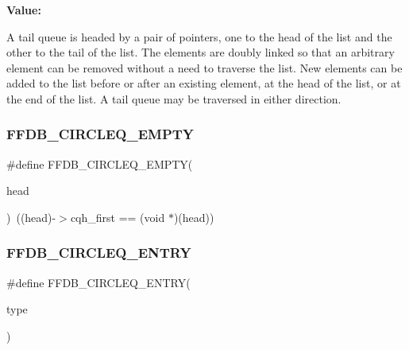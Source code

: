 {\bfseries Value\+:}
\begin{DoxyCode}{0}
\DoxyCodeLine{\}}

\end{DoxyCode}
A tail queue is headed by a pair of pointers, one to the head of the list and the other to the tail of the list. The elements are doubly linked so that an arbitrary element can be removed without a need to traverse the list. New elements can be added to the list before or after an existing element, at the head of the list, or at the end of the list. A tail queue may be traversed in either direction. \mbox{\label{adat-devel_2other__libs_2filedb_2filehash_2ffdb__cq_8h_a65ad566b610663661270032cbc4de6d2}} 
\subsubsection{\texorpdfstring{FFDB\_CIRCLEQ\_EMPTY}{FFDB\_CIRCLEQ\_EMPTY}}
{\footnotesize\ttfamily \#define F\+F\+D\+B\+\_\+\+C\+I\+R\+C\+L\+E\+Q\+\_\+\+E\+M\+P\+TY(\begin{DoxyParamCaption}\item[{}]{head }\end{DoxyParamCaption})~((head)-\/$>$cqh\+\_\+first == (void $\ast$)(head))}

\mbox{\label{adat-devel_2other__libs_2filedb_2filehash_2ffdb__cq_8h_a6c7c808085453506c051641493f1ee8e}} 
\subsubsection{\texorpdfstring{FFDB\_CIRCLEQ\_ENTRY}{FFDB\_CIRCLEQ\_ENTRY}}
{\footnotesize\ttfamily \#define F\+F\+D\+B\+\_\+\+C\+I\+R\+C\+L\+E\+Q\+\_\+\+E\+N\+T\+RY(\begin{DoxyParamCaption}\item[{}]{type }\end{DoxyParamCaption})}

